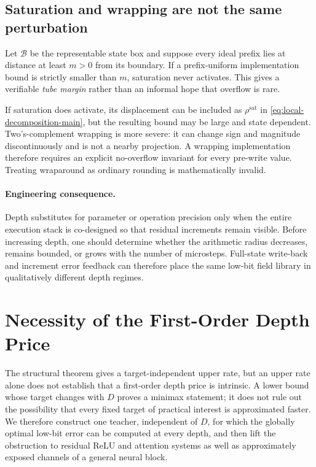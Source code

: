 \documentclass[twoside,11pt]{article}
\begin{document}
\subsection{Saturation and wrapping are not the same perturbation}

Let $\mathcal B$ be the representable state box and suppose every ideal prefix lies at distance at least $m>0$ from its boundary.  If a prefix-uniform implementation bound is strictly smaller than $m$, saturation never activates.  This gives a verifiable \emph{tube margin} rather than an informal hope that overflow is rare.

If saturation does activate, its displacement can be included as $\rho^{\mathrm{sat}}$ in \eqref{eq:local-decomposition-main}, but the resulting bound may be large and state dependent.  Two's-complement wrapping is more severe: it can change sign and magnitude discontinuously and is not a nearby projection.  A wrapping implementation therefore requires an explicit no-overflow invariant for every pre-write value.  Treating wraparound as ordinary rounding is mathematically invalid.

\paragraph{Engineering consequence.}
Depth substitutes for parameter or operation precision only when the entire execution stack is co-designed so that residual increments remain visible.  Before increasing depth, one should determine whether the arithmetic radius decreases, remains bounded, or grows with the number of microsteps.  Full-state write-back and increment error feedback can therefore place the same low-bit field library in qualitatively different depth regimes.

\section{Necessity of the First-Order Depth Price}
\label{sec:necessity-main}

The structural theorem gives a target-independent upper rate, but an upper rate alone does not establish that a first-order depth price is intrinsic.  A lower bound whose target changes with $D$ proves a minimax statement; it does not rule out the possibility that every fixed target of practical interest is approximated faster.  We therefore construct one teacher, independent of $D$, for which the globally optimal low-bit error can be computed at every depth, and then lift the obstruction to residual ReLU and attention systems as well as approximately exposed channels of a general neural block.
\end{document}
